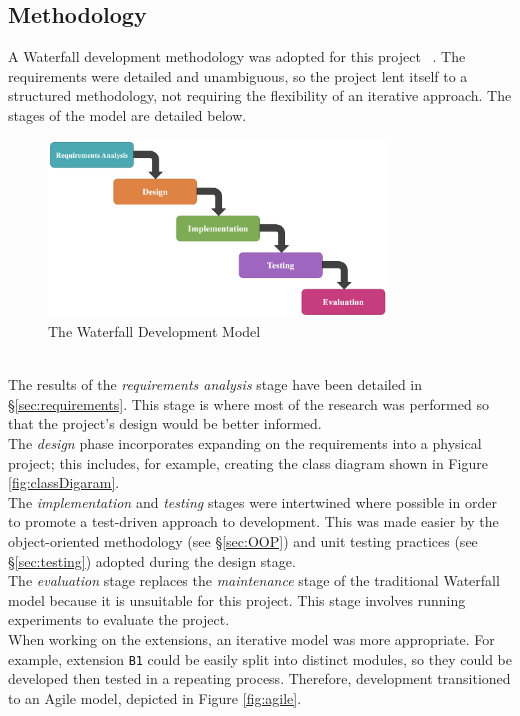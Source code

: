 \subsection{Methodology}
\setlength{\leftskip}{0.5cm}
\indent \indent
A Waterfall development methodology was adopted for this project ~\cite{Waterfall}. The requirements were detailed and unambiguous, so the project lent itself to a structured methodology, not requiring the flexibility of an iterative approach. The stages of the model are detailed below.
\begin{figure}[ht]
    \centering
    \includegraphics[width=0.8\textwidth]{figures/waterfall.png}
    \caption{The Waterfall Development Model}
    \label{fig:waterfall}
\end{figure}
\\ \indent
The results of the \textit{requirements analysis} stage have been detailed in §\ref{sec:requirements}. This stage is where most of the research was performed so that the project's design would be better informed.
\smallskip \\ \indent
The \textit{design} phase incorporates expanding on the requirements into a physical project; this includes, for example, creating the class diagram shown in Figure \ref{fig:classDigaram}.
\smallskip \\ \indent
The \textit{implementation} and \textit{testing} stages were intertwined where possible in order to promote a test-driven approach to development. This was made easier by the object-oriented methodology (see §\ref{sec:OOP}) and unit testing practices (see §\ref{sec:testing}) adopted during the design stage.
\smallskip \\ \indent
The \textit{evaluation} stage replaces the \textit{maintenance} stage of the traditional Waterfall model because it is unsuitable for this project. This stage involves running experiments to evaluate the project.
\smallskip \\ \indent
When working on the extensions, an iterative model was more appropriate. For example, extension \texttt{B1} could be easily split into distinct modules, so they could be developed then tested in a repeating process. Therefore, development transitioned to an Agile model, depicted in Figure \ref{fig:agile}.
